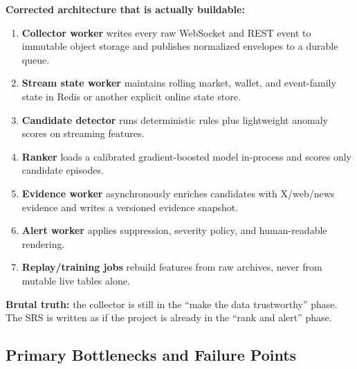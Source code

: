 \documentclass[11pt,letterpaper]{article}
\begin{document}
\textbf{Corrected architecture that is actually buildable:}

\begin{enumerate}[nosep]
    \item \textbf{Collector worker} writes every raw WebSocket and REST event to immutable object storage and publishes normalized envelopes to a durable queue.
    \item \textbf{Stream state worker} maintains rolling market, wallet, and event-family state in Redis or another explicit online state store.
    \item \textbf{Candidate detector} runs deterministic rules plus lightweight anomaly scores on streaming features.
    \item \textbf{Ranker} loads a calibrated gradient-boosted model in-process and scores only candidate episodes.
    \item \textbf{Evidence worker} asynchronously enriches candidates with X/web/news evidence and writes a versioned evidence snapshot.
    \item \textbf{Alert worker} applies suppression, severity policy, and human-readable rendering.
    \item \textbf{Replay/training jobs} rebuild features from raw archives, never from mutable live tables alone.
\end{enumerate}

\textbf{Brutal truth:} the collector is still in the ``make the data trustworthy'' phase. The SRS is written as if the project is already in the ``rank and alert'' phase.

\subsection{Primary Bottlenecks and Failure Points}
\end{document}
